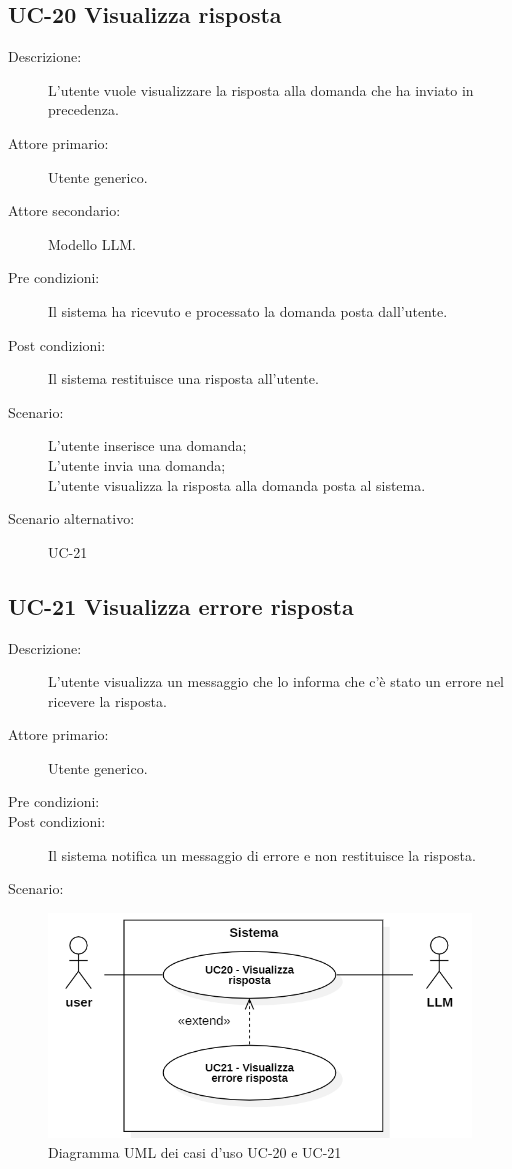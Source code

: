 \subsection{UC-20 Visualizza risposta}
\begin{description}
    \item[Descrizione:] L'utente vuole visualizzare la risposta alla domanda che ha inviato in precedenza.
    \item[Attore primario:] Utente generico.
    \item[Attore secondario:] Modello LLM. 
    \item[Pre condizioni:] Il sistema ha ricevuto e processato la domanda posta dall'utente.
    \item[Post condizioni:] Il sistema restituisce una risposta all'utente.
    \item[Scenario:] L'utente inserisce una domanda;\\L'utente invia una domanda;\\L'utente visualizza la risposta alla domanda posta al sistema.
    \item[Scenario alternativo:] UC-21
\end{description}

\subsection{UC-21 Visualizza errore risposta}
\begin{description}
    \item[Descrizione:] L'utente visualizza un messaggio che lo informa che c'è stato un errore nel ricevere la risposta.
    \item[Attore primario:] Utente generico.
    \item[Pre condizioni:] 
    \item[Post condizioni:] Il sistema notifica un messaggio di errore e non restituisce la risposta.
    \item[Scenario:] 
\end{description}

\begin{figure}[H]
    \centering
    \includegraphics[width=0.8\linewidth]{UC20-21.PNG}
    \caption{Diagramma UML dei casi d'uso UC-20 e UC-21}
    \label{fig:UC20-21}
\end{figure}

